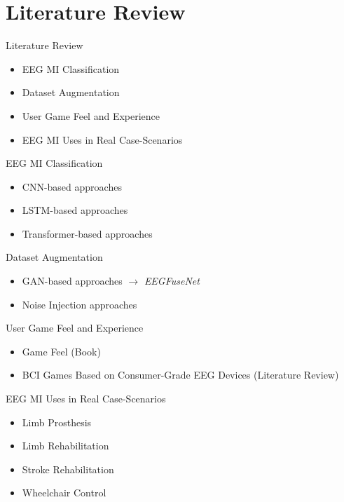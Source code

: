 \section{Literature Review}
\begin{frame}{Literature Review}
\begin{itemize}
    \item EEG MI Classification
    \item Dataset Augmentation
    \item User Game Feel and Experience
    \item EEG MI Uses in Real Case-Scenarios
\end{itemize}
\end{frame}

\begin{frame}{EEG MI Classification}
\begin{itemize}
    \item CNN-based approaches
    \item LSTM-based approaches
    \item Transformer-based approaches
\end{itemize}
\end{frame}

\begin{frame}{Dataset Augmentation}
\begin{itemize}
    \item GAN-based approaches $\rightarrow$ \textit{EEGFuseNet}
    \item Noise Injection approaches
\end{itemize}
\end{frame}

\begin{frame}{User Game Feel and Experience}
\begin{itemize}
    \item Game Feel (Book)
    \item BCI Games Based on Consumer-Grade EEG Devices (Literature Review)
\end{itemize}
\end{frame}

\begin{frame}{EEG MI Uses in Real Case-Scenarios}
\begin{itemize}
    \item Limb Prosthesis
    \item Limb Rehabilitation
    \item Stroke Rehabilitation
    \item Wheelchair Control
\end{itemize}
\end{frame}
